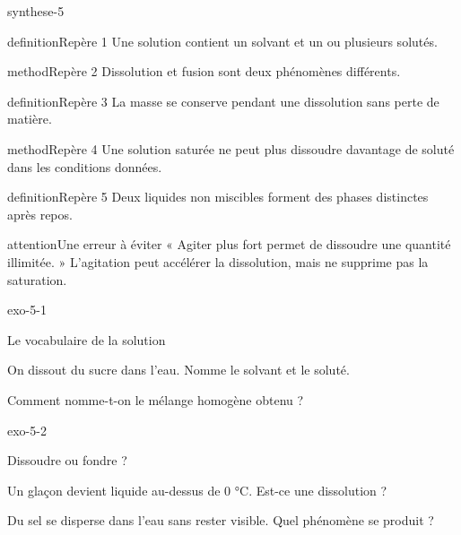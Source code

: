 \documentclass[12pt,twoside,openany]{book}
\begin{document}
\begin{pcFiche}{synthese-5}
\begin{pcEncadre}{definition}{Repère 1}
Une solution contient un solvant et un ou plusieurs solutés.\par
\end{pcEncadre}
\begin{pcEncadre}{method}{Repère 2}
Dissolution et fusion sont deux phénomènes différents.\par
\end{pcEncadre}
\begin{pcEncadre}{definition}{Repère 3}
La masse se conserve pendant une dissolution sans perte de matière.\par
\end{pcEncadre}
\begin{pcEncadre}{method}{Repère 4}
Une solution saturée ne peut plus dissoudre davantage de soluté dans les conditions données.\par
\end{pcEncadre}
\begin{pcEncadre}{definition}{Repère 5}
Deux liquides non miscibles forment des phases distinctes après repos.\par
\end{pcEncadre}
\begin{pcEncadre}{attention}{Une erreur à éviter}
« Agiter plus fort permet de dissoudre une quantité illimitée. » L’agitation peut accélérer la dissolution, mais ne supprime pas la saturation.\par
\end{pcEncadre}
\end{pcFiche}
\clearpage{}
\begin{blocLivre}{exo-5-1}
\begin{exercice}[1]{Le vocabulaire de la solution}
\begin{questions}
\item On dissout du sucre dans l’eau. Nomme le solvant et le soluté.
\item Comment nomme-t-on le mélange homogène obtenu ?
\end{questions}
\end{exercice}\end{blocLivre}
\begin{blocLivre}{exo-5-2}
\begin{exercice}[1]{Dissoudre ou fondre ?}
\begin{questions}
\item Un glaçon devient liquide au-dessus de 0 °C. Est-ce une dissolution ?
\item Du sel se disperse dans l’eau sans rester visible. Quel phénomène se produit ?
\end{questions}
\end{exercice}\end{blocLivre}
\end{document}
